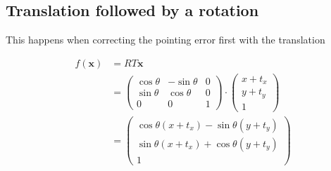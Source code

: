 \documentclass[paper=a4, fontsize=11pt]{article}
\begin{document}
\subsection{Translation followed by a rotation}
This happens when correcting the pointing error first with the translation

\begin{align*}
	f(\bm{x}) &= RT\bm{x} \\
	&=
		\begin{pmatrix}
			\cos \theta & -\sin \theta & 0 \\
			\sin \theta & \cos \theta & 0 \\
			0 & 0 & 1
		\end{pmatrix}
		\cdot
		\begin{pmatrix}
			x + t_x \\
			y + t_y \\
			1
		\end{pmatrix} \\
	&=
		\begin{pmatrix}
			\cos \theta (x + t_x) - \sin \theta (y + t_y)\\
			\sin \theta (x + t_x) + \cos \theta (y + t_y)\\
			1
		\end{pmatrix}
\end{align*}




\end{document}
